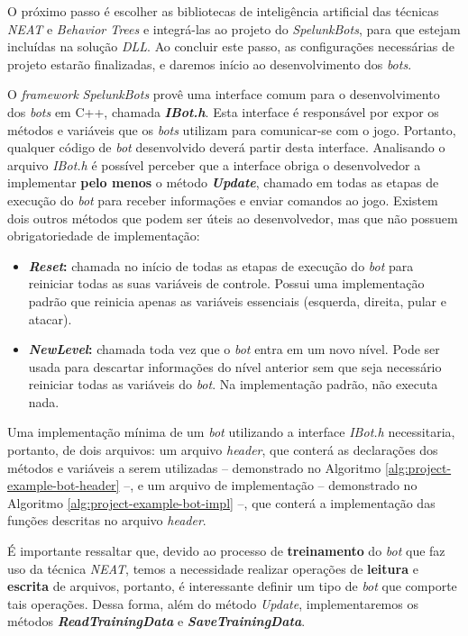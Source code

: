 O próximo passo é escolher as bibliotecas de inteligência artificial das
técnicas \textit{NEAT} e \textit{Behavior Trees} e integrá-las ao projeto do
\textit{SpelunkBots}, para que estejam incluídas na solução \textit{DLL}. Ao
concluir este passo, as configurações necessárias de projeto estarão
finalizadas, e daremos início ao desenvolvimento dos \textit{bots}.

O \textit{framework} \textit{SpelunkBots} provê uma interface comum para o
desenvolvimento dos \textit{bots} em C++, chamada \textbf{\textit{IBot.h}}. Esta
interface é responsável por expor os métodos e variáveis que os \textit{bots}
utilizam para comunicar-se com o jogo. Portanto, qualquer código de \textit{bot}
desenvolvido deverá partir desta interface. Analisando o arquivo \textit{IBot.h}
é possível perceber que a interface obriga o desenvolvedor a implementar
\textbf{pelo menos} o método \textbf{\textit{Update}}, chamado em todas as
etapas de execução do \textit{bot} para receber informações e enviar comandos ao
jogo. Existem dois outros métodos que podem ser úteis ao desenvolvedor, mas que
não possuem obrigatoriedade de implementação:

\begin{itemize}
	\item
		\textbf{\textit{Reset}:} chamada no início de todas as etapas de
		execução do \textit{bot} para reiniciar todas as suas variáveis de
		controle. Possui uma implementação padrão que reinicia apenas as
		variáveis essenciais (esquerda, direita, pular e atacar).

	\item
		\textbf{\textit{NewLevel}:} chamada toda vez que o \textit{bot} entra em
		um novo nível. Pode ser usada para descartar informações do nível
		anterior sem que seja necessário reiniciar todas as variáveis do
		\textit{bot}. Na implementação padrão, não executa nada.
\end{itemize}

Uma implementação mínima de um \textit{bot} utilizando a interface
\textit{IBot.h} necessitaria, portanto, de dois arquivos: um arquivo
\textit{header}, que conterá as declarações dos métodos e variáveis a serem
utilizadas -- demonstrado no Algoritmo \ref{alg:project-example-bot-header} --,
e um arquivo de implementação -- demonstrado no Algoritmo
\ref{alg:project-example-bot-impl} --, que conterá a implementação das funções
descritas no arquivo \textit{header}.

É importante ressaltar que, devido ao processo de \textbf{treinamento} do
\textit{bot} que faz uso da técnica \textit{NEAT}, temos a necessidade realizar
operações de \textbf{leitura} e \textbf{escrita} de arquivos, portanto, é
interessante definir um tipo de \textit{bot} que comporte tais operações. Dessa
forma, além do método \textit{Update}, implementaremos os métodos
\textbf{\textit{ReadTrainingData}} e \textbf{\textit{SaveTrainingData}}.


